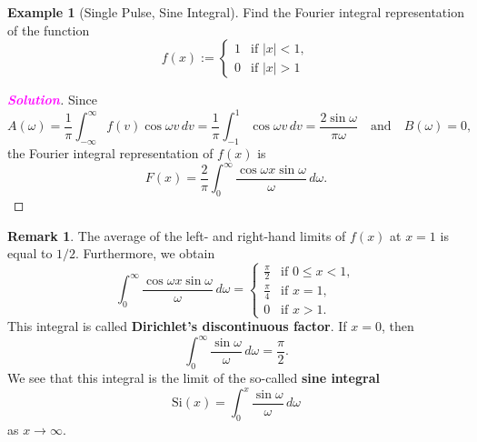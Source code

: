 \documentclass[12pt,openany]{book}
\theoremstyle{definition}
\newtheorem{remark}{Remark}[chapter]
\newtheorem{example}{Example}[chapter]
\newcommand{\sol}{\textcolor{magenta}{\bf Solution}}
\begin{document}
	\vspace{24pt}
	\begin{example}[Single Pulse, Sine Integral]
		Find the Fourier integral representation of the function
		\[
		f(x) :=
		\begin{cases}
			1 & \text{if } |x| < 1, \\
			0 & \text{if } |x| > 1
		\end{cases}
		\]
		\begin{proof}[\sol]
			Since
			\[
			A(\omega) = \frac{1}{\pi} \int_{-\infty}^{\infty} f(v) \cos \omega v \, dv = \frac{1}{\pi} \int_{-1}^{1} \cos \omega v \, dv = \frac{2 \sin \omega}{\pi \omega} \quad \text{and} \quad B(\omega) = 0,
			\]
			the Fourier integral representation of \( f(x) \) is
			\[
			F(x) = \frac{2}{\pi} \int_{0}^{\infty} \frac{\cos \omega x \sin \omega}{\omega} \, d\omega.
			\]
		\end{proof}
	\end{example}
	\vspace{12pt}
	\begin{remark}
		The average of the left- and right-hand limits of \( f(x) \) at \( x = 1 \) is equal to \( 1/2 \).
		Furthermore, we obtain
			\[
			\int_{0}^{\infty} \frac{\cos \omega x \sin \omega}{\omega} \, d\omega =
			\begin{cases}
				\frac{\pi}{2} & \text{if } 0 \leq x < 1, \\
				\frac{\pi}{4} & \text{if } x = 1, \\
				0 & \text{if } x > 1.
			\end{cases}
			\]
			This integral is called \textbf{Dirichlet’s discontinuous factor}.
			If \( x = 0 \), then
			\[
			\int_{0}^{\infty} \frac{\sin \omega}{\omega} \, d\omega = \frac{\pi}{2}.
			\]
			We see that this integral is the limit of the so-called \textbf{sine integral}
			\[
			\text{Si}(x) = \int_{0}^{x} \frac{\sin \omega}{\omega} \, d\omega
			\]
			as \( x \to \infty \).
	\end{remark}
	
\end{document}
